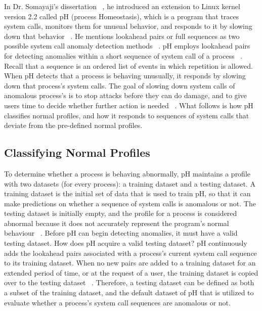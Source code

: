 \documentclass{report}
\begin{document}
\begin{spacing}{1.5}
{\large
In Dr. Somayaji's dissertation ~\cite{somayaji2002operating}, he introduced an extension to Linux kernel version 2.2 called pH (process Homeostasis), which is a program that traces system calls, monitors them for unusual behavior, and responds to it by slowing down that behavior ~\cite{somayaji2002operating}. He mentions lookahead pairs or full sequences as two possible system call anomaly detection methods  ~\cite{inoue2007lookahead}. pH employs lookahead pairs for detecting anomalies within a short sequence of system call of a process ~\cite{somayaji2002operating}. Recall that a sequence is an ordered list of events in which repetition is allowed. When pH detects that a process is behaving unusually, it responds by slowing down that process’s system calls. The goal of slowing down system calls of anomalous process's is to stop attacks before they can do damage, and to give users time to decide whether further action is needed ~\cite{somayaji2002operating}. What follows is how pH classifies normal profiles, and how it responds to sequences of system calls that deviate from the pre-defined normal profiles.
\newline
}





\subsection{Classifying Normal Profiles}

{\large
To determine whether a process is behaving abnormally, pH maintains a profile with two datasets (for every process): a training dataset and a testing dataset. A training dataset is the initial set of data that is used to train pH, so that it can make predictions on whether a sequence of system calls is anomalous or not. The testing dataset is initially empty, and the profile for a process is considered abnormal because it does not accurately represent the program's normal behaviour ~\cite{somayaji2002operating}. Before pH can begin detecting anomalies, it must have a valid testing dataset. How does pH acquire a valid testing dataset? pH continuously adds the lookahead pairs associated with a process's current system call sequence to its training dataset. When no new pairs are added to a training dataset for an extended period of time, or at the request of a user, the training dataset is copied over to the testing dataset ~\cite{somayaji2002operating}. Therefore, a testing dataset can be defined as both a subset of the training dataset, and the default dataset of pH that is utilized to evaluate whether a process's system call sequences are anomalous or not.
\leavevmode\newline
}




\end{spacing}
\end{document}
